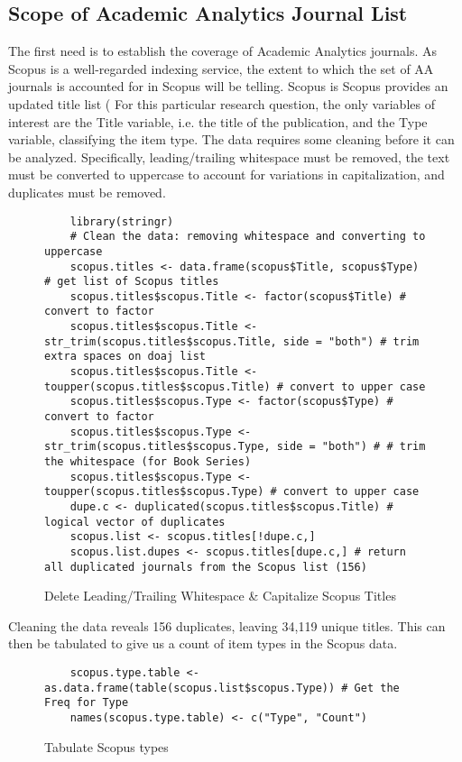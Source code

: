 \documentclass{article}
\begin{document}
\subsection{Scope of Academic Analytics Journal List}
The first need is to establish the coverage of Academic Analytics journals.
As Scopus is a well-regarded indexing service, the extent to which the set of AA journals is accounted for in Scopus will be telling.
Scopus is %
Scopus provides an updated title list (%
For this particular research question, the only variables of interest are the Title variable, i.e. the title of the publication, and the Type variable, classifying the item type.
The data requires some cleaning before it can be analyzed.
Specifically, leading/trailing whitespace must be removed, the text must be converted to uppercase to account for variations in capitalization, and duplicates must be removed.
\begin{figure}
	\centering
	\begin{lstlisting}
	library(stringr)
	# Clean the data: removing whitespace and converting to uppercase
	scopus.titles <- data.frame(scopus$Title, scopus$Type) # get list of Scopus titles
	scopus.titles$scopus.Title <- factor(scopus$Title) # convert to factor
	scopus.titles$scopus.Title <- str_trim(scopus.titles$scopus.Title, side = "both") # trim extra spaces on doaj list
	scopus.titles$scopus.Title <- toupper(scopus.titles$scopus.Title) # convert to upper case
	scopus.titles$scopus.Type <- factor(scopus$Type) # convert to factor
	scopus.titles$scopus.Type <- str_trim(scopus.titles$scopus.Type, side = "both") # # trim the whitespace (for Book Series)
	scopus.titles$scopus.Type <- toupper(scopus.titles$scopus.Type) # convert to upper case
	dupe.c <- duplicated(scopus.titles$scopus.Title) # logical vector of duplicates
	scopus.list <- scopus.titles[!dupe.c,]
	scopus.list.dupes <- scopus.titles[dupe.c,] # return all duplicated journals from the Scopus list (156)
	\end{lstlisting}
	\caption{Delete Leading/Trailing Whitespace \& Capitalize Scopus Titles}
\end{figure}

Cleaning the data reveals 156 duplicates, leaving 34,119 unique titles. 
This can then be tabulated to give us a count of item types in the Scopus data.
\begin{figure}
	\centering
	\begin{lstlisting}
	scopus.type.table <- as.data.frame(table(scopus.list$scopus.Type)) # Get the Freq for Type
	names(scopus.type.table) <- c("Type", "Count")
	\end{lstlisting}
	\caption{Tabulate Scopus types}
\end{figure}
\end{document}
